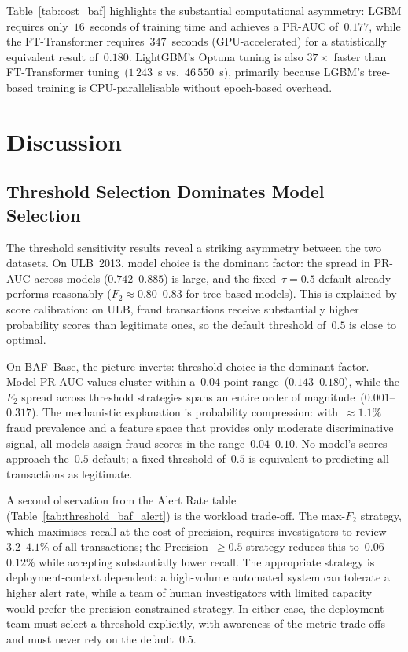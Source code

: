 \documentclass[a4paper,fleqn]{cas-sc}
\begin{document}
Table~\ref{tab:cost_baf} highlights the substantial computational asymmetry:
LGBM requires only~$16$~seconds of training time and achieves a PR-AUC of~$0.177$,
while the FT-Transformer requires~$347$~seconds (GPU-accelerated) for a statistically
equivalent result of~$0.180$.
LightGBM's Optuna tuning is also $37\times$ faster than FT-Transformer tuning~($1\,243$~s
vs.\ $46\,550$~s), primarily because LGBM's tree-based training is CPU-parallelisable
without epoch-based overhead.

\section{Discussion}
\label{sec:discussion}

\subsection{Threshold Selection Dominates Model Selection}
\label{subsec:disc_threshold}

The threshold sensitivity results reveal a striking asymmetry between the two datasets.
On ULB~2013, model choice is the dominant factor: the spread in PR-AUC across models
($0.742$--$0.885$) is large, and the fixed~$\tau=0.5$ default already performs
reasonably ($F_2\!\approx\!0.80$--$0.83$ for tree-based models).
This is explained by score calibration: on ULB, fraud transactions receive substantially
higher probability scores than legitimate ones, so the default threshold of~$0.5$ is
close to optimal.

On BAF~Base, the picture inverts: threshold choice is the dominant factor.
Model PR-AUC values cluster within a~$0.04$-point range~($0.143$--$0.180$), while
the $F_2$ spread across threshold strategies spans an entire order of magnitude~($0.001$--$0.317$).
The mechanistic explanation is probability compression: with~${\approx}1.1\%$ fraud
prevalence and a feature space that provides only moderate discriminative signal, all
models assign fraud scores in the range~$0.04$--$0.10$.
No model's scores approach the~$0.5$ default; a fixed threshold of~$0.5$ is equivalent
to predicting all transactions as legitimate.

A second observation from the Alert Rate table (Table~\ref{tab:threshold_baf_alert})
is the workload trade-off.
The max-$F_2$ strategy, which maximises recall at the cost of precision, requires
investigators to review~$3.2$--$4.1\%$ of all transactions; the Precision~$\geq\!0.5$
strategy reduces this to~$0.06$--$0.12\%$ while accepting substantially lower recall.
The appropriate strategy is deployment-context dependent: a high-volume automated
system can tolerate a higher alert rate, while a team of human investigators with limited
capacity would prefer the precision-constrained strategy.
In either case, the deployment team must select a threshold explicitly, with awareness
of the metric trade-offs --- and must never rely on the default~$0.5$.
\end{document}
